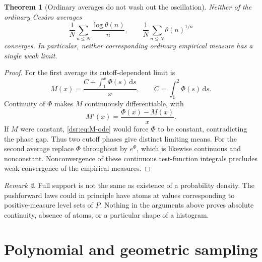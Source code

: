 \documentclass[11pt,a4paper]{article}
\numberwithin{equation}{section}
\newtheorem{theorem}{Theorem}[section]
\theoremstyle{definition}
\theoremstyle{remark}
\newtheorem{remark}[theorem]{Remark}
\newcommand{\dd}{\,\mathrm d}
\theoremstyle{definition}
\theoremstyle{plain}
\begin{document}
\begin{theorem}[Ordinary averages do not wash out the oscillation]
\label{dsr:thm:mean-nonconvergence}
Neither of the ordinary Ces\`aro averages
\begin{equation}
 \frac1N\sum_{n\le N}\frac{\log\theta(n)}n,
 \qquad
 \frac1N\sum_{n\le N}\theta(n)^{1/n}
\end{equation}
converges. In particular, neither corresponding ordinary empirical measure
has a single weak limit.
\end{theorem}
\begin{proof}
For the first average its cutoff-dependent limit is
\begin{equation}
 M(x)=\frac{C+\int_1^x\Phi(s)\dd s}{x},\qquad
 C=\int_1^2\Phi(s)\dd s.
\end{equation}
Continuity of $\Phi$ makes $M$ continuously differentiable, with
\begin{equation}
 M'(x)=\frac{\Phi(x)-M(x)}x.
\label{dsr:eq:M-ode}
\end{equation}
If $M$ were constant, \eqref{dsr:eq:M-ode} would force $\Phi$ to be constant,
contradicting the phase gap. Thus two cutoff phases give distinct limiting
means. For the second average replace $\Phi$ throughout by $e^\Phi$, which
is likewise continuous and nonconstant. Nonconvergence of these continuous
test-function integrals precludes weak convergence of the empirical measures.
\end{proof}

\begin{remark}
Full support is not the same as existence of a probability density. The
pushforward laws could in principle have atoms at values corresponding to
positive-measure level sets of $P$. Nothing in the arguments above proves
absolute continuity, absence of atoms, or a particular shape of a histogram.
\end{remark}

\section{Polynomial and geometric sampling}
\label{dsr:sec:sampling}
\end{document}
